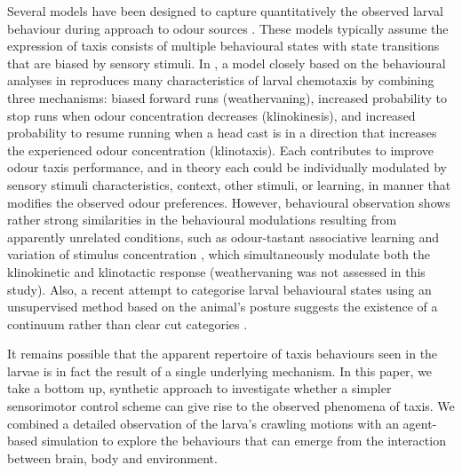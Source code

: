 \documentclass[11pt,a4paper]{article}
\newcommand{\todoBW}[1]{\todo[author=BW,color=orange, size=\tiny,inline]{#1}}
\begin{document}
Several models have been designed to capture quantitatively the observed larval behaviour during approach to odour sources  \citep{davies2015model,hernandez2015reverse,schleyer2015learning,gepner2015computations}. These models typically assume the expression of taxis consists of multiple behavioural states with state transitions that are biased by sensory stimuli. In \cite{davies2015model}, a model closely based on the behavioural analyses in
 \citet{lahiri2011two,gomez2014multilevel,gomez2011active} reproduces many characteristics of larval chemotaxis by combining three mechanisms: biased forward runs (weathervaning), increased probability to stop runs when odour concentration decreases (klinokinesis), and increased probability to resume running when a head cast is in a direction that increases the experienced odour concentration (klinotaxis). Each contributes to improve odour taxis performance, and in theory each could be individually modulated by sensory stimuli characteristics, context, other stimuli, or learning, in manner that modifies the observed odour preferences. 
However, behavioural observation shows rather strong similarities in the behavioural modulations resulting from apparently unrelated conditions, such as odour-tastant associative learning and variation of stimulus concentration \citep{schleyer2015learning}, which simultaneously modulate both the klinokinetic and klinotactic response (weathervaning was not assessed in this study). Also, a recent attempt to categorise larval behavioural states using an unsupervised method based on the animal's posture suggests the existence of a continuum rather than clear cut categories \citep{szigeti2016motifs}.


It remains possible that the apparent repertoire of taxis behaviours seen in the larvae is in fact the result of a single underlying mechanism. In this paper, we take a bottom up, synthetic approach \citep{braitenberg1986vehicles} to investigate whether a simpler sensorimotor control scheme can give rise to the observed phenomena of taxis. We combined a detailed observation of the larva's crawling motions with an agent-based simulation to explore the behaviours that can emerge from the interaction between brain, body and environment.
\end{document}
